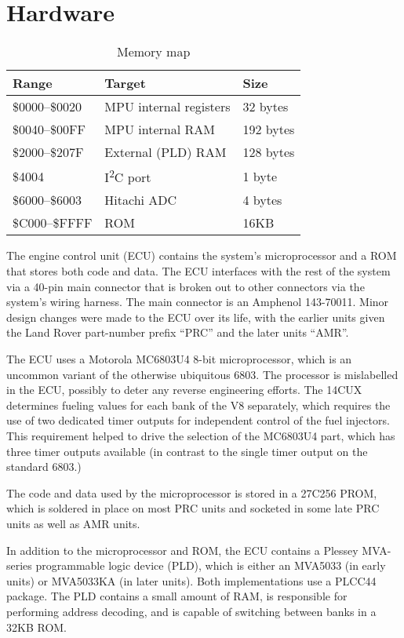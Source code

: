 \documentclass[11pt,twocolumn]{scrartcl}
\begin{document}
\section {Hardware}
 \begin{table*}
  \centering
  \begin{tabular}{|l|l|l|}
   \hline
   \bfseries{Range} & \bfseries{Target} & \bfseries{Size} \\ \hline
   \$0000--\$0020 & MPU internal registers & 32 bytes \\ \hline
   \$0040--\$00FF & MPU internal RAM & 192 bytes \\      \hline
   \$2000--\$207F & External (PLD) RAM & 128 bytes \\    \hline
   \$4004 & I\textsuperscript{2}C port & 1 byte \\     \hline
   \$6000--\$6003 & Hitachi ADC & 4 bytes \\             \hline
   \$C000--\$FFFF & ROM & 16KB \\                       \hline
  \end{tabular}
  \caption{Memory map\label{tab:Memorymap}}
 \end{table*}
The engine control unit (ECU) contains the system's microprocessor and a ROM that stores both code and data. The ECU interfaces with the rest of the system via a 40-pin main connector that is broken out to other connectors via the system's wiring harness. The main connector is an Amphenol 143-70011. Minor design changes were made to the ECU over its life, with the earlier units given the Land Rover part-number prefix ``PRC'' and the later units ``AMR''.

The ECU uses a Motorola MC6803U4 8-bit microprocessor, which is an uncommon variant of the otherwise ubiquitous 6803. The processor is mislabelled in the ECU, possibly to deter any reverse engineering efforts. The 14CUX determines fueling values for each bank of the V8 separately, which requires the use of two dedicated timer outputs for independent control of the fuel injectors. This requirement helped to drive the selection of the MC6803U4 part, which has three timer outputs available (in contrast to the single timer output on the standard 6803.)

The code and data used by the microprocessor is stored in a 27C256 PROM, which is soldered in place on most PRC units and socketed in some late PRC units as well as AMR units.

In addition to the microprocessor and ROM, the ECU contains a Plessey MVA-series programmable logic device (PLD), which is either an MVA5033 (in early units) or MVA5033KA (in later units). Both implementations use a PLCC44 package. The PLD contains a small amount of RAM, is responsible for performing address decoding, and is capable of switching between banks in a 32KB ROM.
\end{document}
